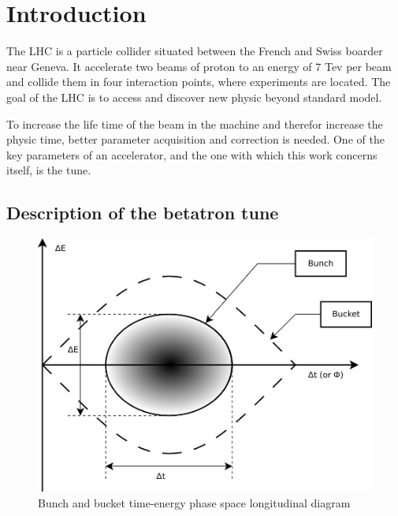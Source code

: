 %


\chapter{Introduction}

The \gls{LHC} is a particle collider situated between the French and
Swiss boarder near Geneva. It accelerate two beams of proton to an
energy of 7 Tev per beam and collide them in four interaction points,
where experiments are located. The goal of the \gls{LHC} is to access
and discover new physic beyond standard model.

To increase the life time of the beam in the machine and therefor
increase the physic time, better parameter acquisition and correction
is needed. One of the key parameters of an accelerator, and the one
with which this work concerns itself, is the \gls{tune}.

\section{Description of the betatron tune}

\begin{figure}[H]
\centering
\caption{Bunch and bucket time-energy phase space longitudinal diagram}
\includegraphics[scale=0.3]{phase_space.jpeg}
\end{figure}

